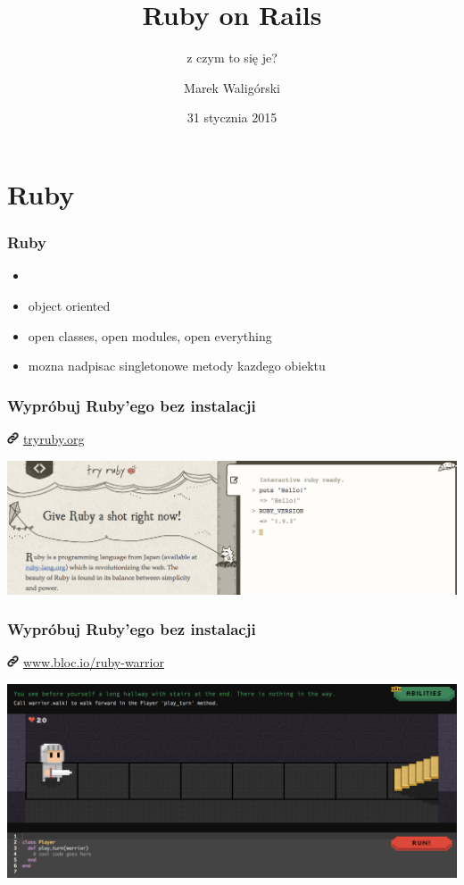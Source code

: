 \documentclass{beamer}
\title{Ruby on Rails}
\subtitle{z czym to się je?}
\author{Marek Waligórski}
\date{31 stycznia 2015}
\institute{InfoMEET Poznań}
\newcommand{\myurl}[1]{%
    \begin{block}{}
       \centering \huge
       \includegraphics[width=0.35cm]{link.png}
       \hspace{0.1cm}
       \url{#1}
    \end{block}
}
\begin{document}
\begin{frame}[fragile]
\titlepage
\end{frame}

\section{Ruby}
\begin{frame}[fragile]\frametitle{Ruby}
    \begin{itemize}
        \item 
        \item object oriented
        \item open classes, open modules, open everything
        \item mozna nadpisac singletonowe metody kazdego obiektu
    \end{itemize}
\end{frame}


\begin{frame}[fragile]
\frametitle{Wypróbuj Ruby'ego bez instalacji}
    \myurl{tryruby.org}
    \hspace*{-1.1cm}
    \includegraphics[width=\paperwidth]{tryruby.png}
\end{frame}
\begin{frame}[fragile]
\frametitle{Wypróbuj Ruby'ego bez instalacji}
    \myurl{www.bloc.io/ruby-warrior}
    \hspace*{-1.1cm}
    \includegraphics[width=\paperwidth]{rubywarrior.png}
\end{frame}
\end{document}
